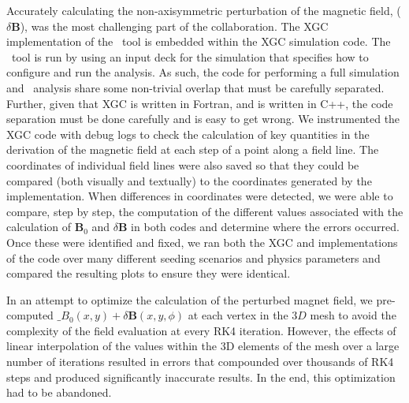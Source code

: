 Accurately calculating the non-axisymmetric perturbation of the magnetic field, ($\delta\boldsymbol{B}$), was the most challenging part of the collaboration.
The XGC implementation of the \poincare\ tool is embedded within the XGC simulation code. The \poincare\ tool is run by using an input deck for the simulation that specifies how to configure and run the analysis. As such, the code for performing a full simulation and \poincare\ analysis share some non-trivial overlap that must be carefully separated. Further, given that XGC is written in Fortran, and \vtkm is written in C++, the code separation must be done carefully and is easy to get wrong. We instrumented the XGC code with debug logs to check the calculation of key quantities in the derivation of the magnetic field at each step of a point along a field line. The coordinates of individual field lines were also saved so that they could be compared (both visually and textually) to the coordinates generated by the \vtkm implementation. When differences in coordinates were detected, we were able to compare, step by step, the computation of the different values associated with the calculation of $\boldsymbol{B}_0$ and $\delta\boldsymbol{B}$ in both codes and determine where the errors occurred. Once these were identified and fixed, we ran both the XGC and \vtkm implementations of the code over many different seeding scenarios and physics parameters and compared the resulting \poincare plots to ensure they were identical.

In an attempt to optimize the calculation of the perturbed magnet field, we pre-computed $\boldsymbol_{B}_0(x,y) + \delta\boldsymbol{B}(x,y,\phi)$ at each vertex in the $3D$ mesh to avoid the complexity of the field evaluation at every RK4 iteration. However, the effects of linear interpolation of the values within the 3D elements of the mesh over a large number of iterations resulted in errors that compounded over thousands of RK4 steps and produced significantly inaccurate results. In the end, this optimization had to be abandoned.


